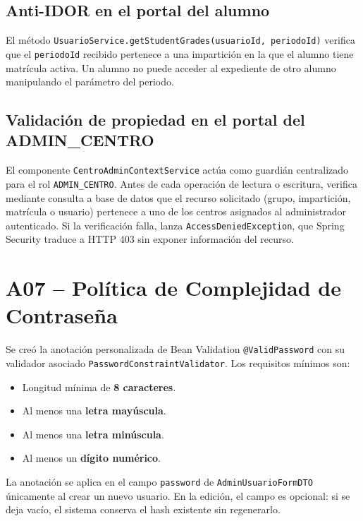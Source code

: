\documentclass[12pt, a4paper]{report}
\begin{document}
\subsection{Anti-IDOR en el portal del alumno}

El método \texttt{UsuarioService.getStudentGrades(usuarioId, periodoId)} verifica que el \texttt{periodoId} recibido pertenece a una impartición en la que el alumno tiene matrícula activa. Un alumno no puede acceder al expediente de otro alumno manipulando el parámetro del periodo.

\subsection{Validación de propiedad en el portal del ADMIN\_CENTRO}

El componente \texttt{CentroAdminContextService} actúa como guardián centralizado para el rol \texttt{ADMIN\_CENTRO}. Antes de cada operación de lectura o escritura, verifica mediante consulta a base de datos que el recurso solicitado (grupo, impartición, matrícula o usuario) pertenece a uno de los centros asignados al administrador autenticado. Si la verificación falla, lanza \texttt{AccessDeniedException}, que Spring Security traduce a HTTP 403 sin exponer información del recurso.

\section{A07 -- Política de Complejidad de Contraseña}

Se creó la anotación personalizada de Bean Validation \texttt{@ValidPassword} con su validador asociado \texttt{PasswordConstraintValidator}. Los requisitos mínimos son:

\begin{itemize}
  \item Longitud mínima de \textbf{8 caracteres}.
  \item Al menos una \textbf{letra mayúscula}.
  \item Al menos una \textbf{letra minúscula}.
  \item Al menos un \textbf{dígito numérico}.
\end{itemize}

La anotación se aplica en el campo \texttt{password} de \texttt{AdminUsuarioFormDTO} únicamente al crear un nuevo usuario. En la edición, el campo es opcional: si se deja vacío, el sistema conserva el hash existente sin regenerarlo.
\end{document}
